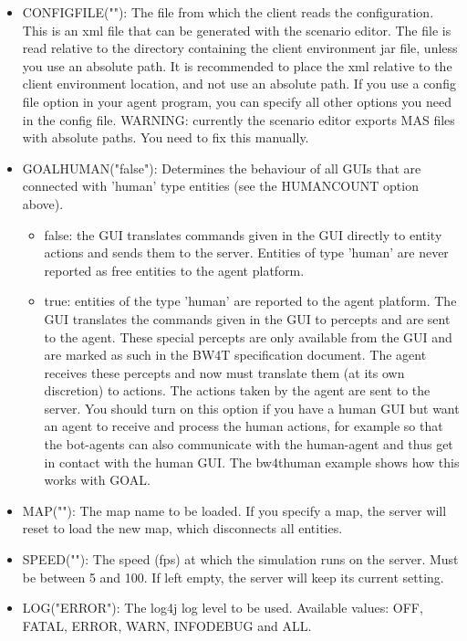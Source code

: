 \documentclass[11pt,a4paper]{article}
\begin{document}
\begin{itemize}
\item
    CONFIGFILE(""):
    The file from which the client reads the configuration. This is an xml file that can be generated with the scenario editor. The file is read relative to the directory containing the client environment jar file, unless you use an absolute path. It is recommended to place the xml relative to the client environment location, and not use an absolute path. If you use a config file option in your agent program, you can specify all other options you need in the config file. WARNING: currently the scenario editor exports MAS files with absolute paths. You need to fix this manually.
 
\item
    GOALHUMAN("false"):
    Determines the behaviour of all GUIs that are connected with 'human' type entities (see the HUMANCOUNT option above).
    \begin{itemize}
    \item false: the GUI translates commands given in the GUI directly to entity actions and sends them to the server. Entities of type 'human' are never reported as free entities to the agent platform. 
    \item true: entities of the type 'human' are reported to the agent platform. The GUI translates the commands given in the GUI to percepts and are sent to the agent. These special percepts are only available from the GUI and are marked as such in the BW4T specification document. The agent receives these percepts and now must translate them (at its own discretion) to actions. The actions taken by the agent are sent to the server. 
  You should turn on this option if you have a human GUI but want an agent to receive and process the human actions, for example so that the bot-agents can also communicate with the human-agent and thus get in contact with the human GUI. The bw4thuman example shows how this works with GOAL.
  \end{itemize}

\item
    MAP(""):
    The map name to be loaded. If you specify a map, the server will reset to load the new map, which disconnects all entities.
     
\item    
    SPEED(""):
    The speed (fps) at which the simulation runs on the server. Must be between 5 and 100. If left empty, the server will keep its current setting.

\item    
    LOG("ERROR"):
    The log4j log level to be used. Available values: OFF, FATAL, ERROR, WARN, INFODEBUG and ALL.

\end{itemize}
\end{document}
